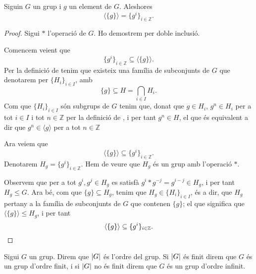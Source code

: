 \documentclass[../Apunts.tex]{subfiles}
\begin{document}
	\begin{proposition}
		\label{prop:forma grups cíclics}
		Siguin \(G\) un grup i \(g\) un element de \(G\). Aleshores
		\[\langle\{g\}\rangle=\{g^{i}\}_{i\in\mathbb{Z}}.\]
		\begin{proof}
			Sigui \(\ast\) l'operació de \(G\). Ho demostrem per doble inclusió.
			
			Comencem veient que
			\[\{g^{i}\}_{i\in\mathbb{Z}}\subseteq\langle\{g\}\rangle.\]
			Per la definició de  tenim que existeix una família de subconjunts de \(G\) que denotarem per \(\{H_{i}\}_{i\in I}\), amb
			\[\{g\}\subseteq H=\bigcap_{i\in I}H_{i}.\]
			Com que \(\{H_{i}\}_{i\in I}\) són subgrups de \(G\) tenim que, donat que \(g\in H_{i}\), \(g^{n}\in H_{i}\) per a tot \(i\in I\) i tot \(n\in\mathbb{Z}\) per la definició de , i per tant \(g^{n}\in H\), el que és equivalent a dir que \(g^{n}\in \langle g\rangle\) per a tot \(n\in\mathbb{Z}\)
			
			Ara veiem que
			\[\langle\{g\}\rangle\subseteq\{g^{i}\}_{i\in\mathbb{Z}}.\]
			Denotarem \(H_{g}=\{g^{i}\}_{i\in\mathbb{Z}}\). Hem de veure que \(H_{g}\) és un grup amb l'operació \(\ast\).
			
			Observem que per a tot \(g^{i},g^{j}\in H_{g}\) es satisfà \(g^{i}\ast g^{-j}=g^{i-j}\in H_{g}\), i per tant \(H_{g}\leq G\). Ara bé, com que \(\{g\}\subseteq H_{g}\), tenim que \(H_{g}\in\{H_{i}\}_{i\in I}\), és a dir, que \(H_{g}\) pertany a la família de subconjunts de \(G\) que contenen \(\{g\}\); el que significa que \(\langle\{g\}\rangle\leq H_{g}\), i per tant \[\langle\{g\}\rangle\subseteq\{g^{i}\}_{i\in\mathbb{Z}}.\qedhere\]
		\end{proof}
	\end{proposition}
	\begin{definition}
		\label{def:ordre d'un grup}
		Sigui \(G\) un grup. Direm que \(\abs{G}\) és l'ordre del grup.
		Si \(\abs{G}\) és finit direm que \(G\) és un grup d'ordre finit, i si \(\abs{G}\) no és finit direm que \(G\) és un grup d'ordre infinit.
	\end{definition}
\end{document}
